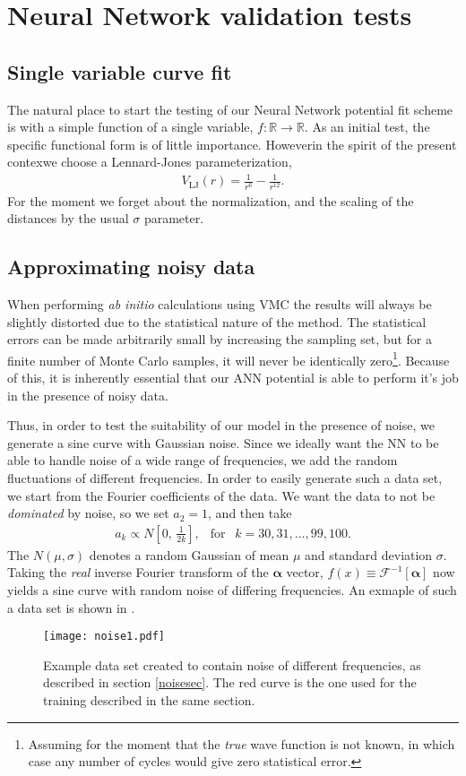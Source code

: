 \documentclass[../../master.tex]{subfiles}
\begin{document}
\chapter{Neural Network validation tests \label{NNvalidation}}
\section{Single variable curve fit}
The natural place to start the testing of our Neural Network potential fit scheme is with a simple function of a single variable, $f:\mathbb{R}\rightarrow\mathbb{R}$. As an initial test, the specific functional form is of little importance. However\textemdash in the spirit of the present contex\textemdash we choose a Lennard-Jones parameterization,
\begin{align}
V_\text{LJ}(r) = \frac{1}{r^{6}}-\frac{1}{r^{12}}.
\end{align}
For the moment we forget about the normalization, and the scaling of the distances by the usual $\sigma$ parameter. 


\section{Approximating noisy data \label{noisesec}}
When performing \emph{ab initio} calculations using VMC the results will always be slightly distorted due to the statistical nature of the method. The statistical errors can be made arbitrarily small by increasing the sampling set, but for a finite number of Monte Carlo samples, it will never be identically zero\footnote{Assuming for the moment that the \emph{true} wave function is not known, in which case any number of cycles would give zero statistical error.}. Because of this, it is inherently essential that our ANN potential is able to perform it's job in the presence of noisy data. 

Thus, in order to test the suitability of our model in the presence of noise, we generate a sine curve with Gaussian noise. Since we ideally want the NN to be able to handle noise of a wide range of frequencies, we add the random fluctuations of different frequencies. In order to easily generate such a data set, we start from the Fourier coefficients of the data. We want the data to not be \emph{dominated} by noise, so we set $a_2=1$, and then take
\begin{align}
a_k\propto N\left[0,\,\frac{1}{2k}\right], \ \ \text{ for } \ \ k=30,31,\dots,99,100.
\end{align}
The $N(\mu,\sigma)$ denotes a random Gaussian of mean $\mu$ and standard deviation $\sigma$. Taking the \emph{real} inverse Fourier transform of the $\bm{\alpha}$ vector, $f(x)\equiv\mathcal{F}^{-1}[\bm{\alpha}]$ now yields a sine curve with random noise of differing frequencies. An exmaple of such a data set is shown in .  
\begin{SCfigure}
\centering
\texttt{[image: noise1.pdf]}
\caption{Example data set created to contain noise of different frequencies, as described in section \ref{noisesec}. The red curve is the one used for the training described in the same section.\label{fig:noise1}}
\end{SCfigure}
\end{document}
